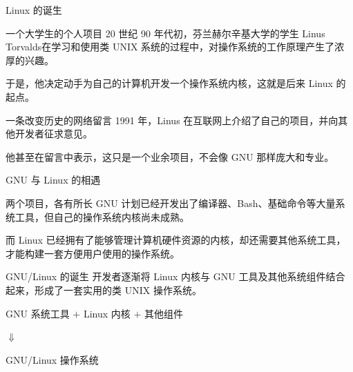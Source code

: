 \documentclass[aspectratio=169]{beamer}
\begin{document}
\begin{frame}{Linux 的诞生}
	\begin{block}{一个大学生的个人项目}
		\hspace*{2em}20 世纪 90 年代初，芬兰赫尔辛基大学的学生 Linus Torvalds在学习和使用类 UNIX 系统的过程中，对操作系统的工作原理产生了浓厚的兴趣。
		\par\hspace*{2em}于是，他决定动手为自己的计算机开发一个操作系统内核，这就是后来 Linux 的起点。
	\end{block}
	\begin{block}{一条改变历史的网络留言}
		\hspace*{2em}1991 年，Linus 在互联网上介绍了自己的项目，并向其他开发者征求意见。
		\par\hspace*{2em}他甚至在留言中表示，这只是一个业余项目，不会像 GNU 那样庞大和专业。
	\end{block}
\end{frame}

\begin{frame}{GNU 与 Linux 的相遇}
	\begin{block}{两个项目，各有所长}
		\hspace*{2em}GNU 计划已经开发出了编译器、Bash、基础命令等大量系统工具，但自己的操作系统内核尚未成熟。
		\par\hspace*{2em}而 Linux 已经拥有了能够管理计算机硬件资源的内核，却还需要其他系统工具，才能构建一套方便用户使用的操作系统。
	\end{block}
	
	\begin{block}{GNU/Linux 的诞生}
		\hspace*{2em}开发者逐渐将 Linux 内核与 GNU 工具及其他系统组件结合起来，形成了一套实用的类 UNIX 操作系统。	
		\begin{center}
			GNU 系统工具
			$+$
			Linux 内核
			$+$
			其他组件
			
			$\Downarrow$
			
			\alert{GNU/Linux 操作系统}
		\end{center}
	\end{block}

\end{frame}
\end{document}
